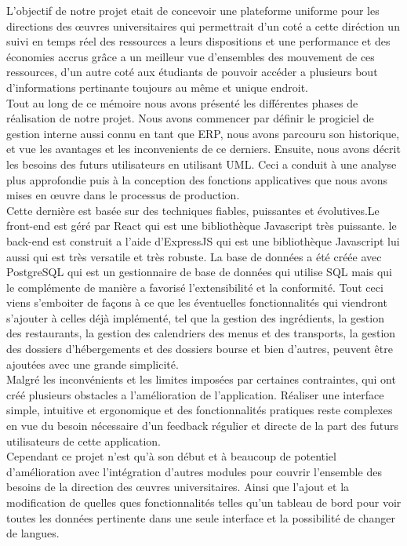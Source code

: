 L'objectif de notre projet etait de concevoir une plateforme uniforme pour les directions des œuvres universitaires qui permettrait d'un coté a cette diréction un suivi en temps réel des ressources a leurs dispositions et une performance et des économies accrus grâce a un meilleur vue d'ensembles des mouvement de ces ressources, d'un autre coté aux étudiants de pouvoir accéder a plusieurs bout d'informations pertinante toujours au même et unique endroit.\\

Tout au long de ce mémoire nous avons présenté les différentes phases de réalisation de notre projet. Nous avons commencer par définir le progiciel de gestion interne aussi connu en tant que \acs{ERP}, nous avons parcouru son historique, et vue les avantages et les inconvenients de ce derniers. Ensuite, nous avons décrit les besoins des futurs utilisateurs en utilisant UML. Ceci a conduit à une analyse plus approfondie puis à la conception des fonctions applicatives que nous avons mises en œuvre dans le processus de production.\\

Cette dernière est basée sur des techniques fiables, puissantes et évolutives.Le front-end est géré par React qui est une bibliothèque Javascript très puissante. le back-end est construit a l'aide d'ExpressJS qui est une bibliothèque Javascript lui aussi qui est très versatile et très robuste. La base de données a été créée avec PostgreSQL qui est un gestionnaire de base de données qui utilise \acs{SQL} mais qui le complémente de manière a favorisé l'extensibilité et la conformité. Tout ceci viens s'emboiter de façons à ce que les éventuelles fonctionnalités qui viendront s'ajouter à celles déjà implémenté, tel que la gestion des ingrédients, la gestion des restaurants, la gestion des calendriers des menus et des transports, la gestion des dossiers d'hébergements et des dossiers bourse et bien d'autres, peuvent être ajoutées avec une grande simplicité.\\

Malgré les inconvénients et les limites imposées par certaines contraintes, qui ont créé plusieurs obstacles a l'amélioration de l'application. Réaliser une interface simple, intuitive et ergonomique et des fonctionnalités pratiques reste complexes en vue du besoin nécessaire d'un feedback régulier et directe de la part des futurs utilisateurs de cette application.\\

Cependant ce projet n'est qu'à son début et à beaucoup de potentiel d'amélioration avec l'intégration d'autres modules pour couvrir l'ensemble des besoins de la direction des œuvres universitaires. Ainsi que l'ajout et la modification de quelles ques fonctionnalités telles qu'un tableau de bord pour voir toutes les données pertinente dans une seule interface et la possibilité de changer de langues.\\

